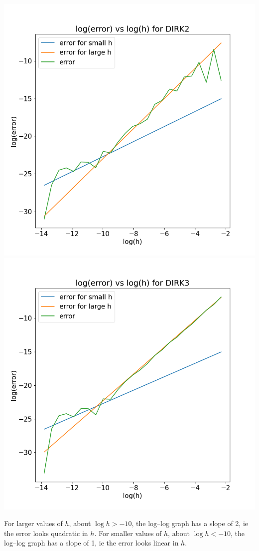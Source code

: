 \documentclass{article}
\begin{document}
\begin{enumerate}
\begin{center}
\includegraphics[scale=.3]{hw3 dirk2 err}
\includegraphics[scale=.3]{hw3 dirk3 err}
\end{center}

For larger values of $h$, about $\log h>-10$, the log--log graph has a slope of 2, ie the error looks quadratic in $h$. For smaller values of $h$, about $\log h<-10$, the log--log graph has a slope of 1, ie the error looks linear in $h$.

\end{enumerate}
\end{document}
